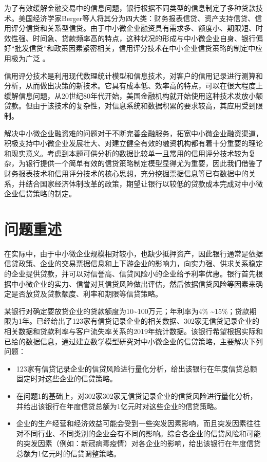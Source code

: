 \documentclass{cumcmthesis}
\begin{document}
为了有效缓解金融交易中的信息问题，银行根据不同类型的信息制定了多种贷款技术。美国经济学家Berger等人将其分为四大类：财务报表信贷、资产支持信贷、信用评分信贷和关系型信贷。由于中小微企业融资具有需求多、额度小、期限短、时效性强、时间急、贷款频率高的特点，这种状况的形成与中小微企业自身、银行偏好“批发信贷”和政策因素紧密相关，信用评分技术在中小企业信贷策略的制定中应用极为广泛 。

信用评分技术是利用现代数理统计模型和信息技术，对客户的信用记录进行测算和分析，从而做出决策的新技术。它具有成本低、效率高的特点，可以在很大程度上缓解信息问题，从20世纪80年代开始，美国金融机构就开始使用这种技术发放小额贷款。但由于该技术的复杂性，对信息系统和数据积累的要求较高，其应用受到限制。		

解决中小微企业融资难的问题对于不断完善金融服务，拓宽中小微企业融资渠道，积极支持中小微企业发展壮大、对建立健全有效的融资机构都有着十分重要的理论和现实意义。考虑到本题可供分析的数据比较单一且常用的信用评分技术较为复杂，为银行提供一个简单有效的信贷策略制定模型显得尤为重要，因此我们借鉴了财务报表技术和信用评分技术的核心思想，充分挖掘票据信息等已有数据中的关系，并结合国家经济体制改革的政策，期望让银行以较低的贷款成本完成对中小微企业信贷策略的制定。



\section{问题重述}

在实际中，由于中小微企业规模相对较小，也缺少抵押资产，因此银行通常是依据信贷政策、企业的交易票据信息和上下游企业的影响力，向实力强、供求关系稳定的企业提供贷款，并可以对信誉高、信贷风险小的企业给予利率优惠。银行首先根据中小微企业的实力、信誉对其信贷风险做出评估，然后依据信贷风险等因素来确定是否放贷及贷款额度、利率和期限等信贷策略。

某银行对确定要放贷企业的贷款额度为10\textasciitilde 100万元；年利率为4\% \textasciitilde 15\%；贷款期限为1年。已经给出了123家有信贷记录企业的相关数据、302家无信贷记录企业的相关数据和贷款利率与客户流失率关系的2019年统计数据。该银行希望根据实际和已给的数据信息，通过建立数学模型研究对中小微企业的信贷策略，主要解决下列问题：
\begin{itemize}
    \item 123家有信贷记录企业的信贷风险进行量化分析，给出该银行在年度信贷总额固定时对这些企业的信贷策略。
    \item 在问题1的基础上，对302家302家无信贷记录企业的信贷风险进行量化分析，并给出该银行在年度信贷总额为1亿元时对这些企业的信贷策略。
    \item 企业的生产经营和经济效益可能会受到一些突发因素影响，而且突发因素往往对不同行业、不同类别的企业会有不同的影响。综合各企业的信贷风险和可能的突发因素（例如：新冠病毒疫情）对各企业的影响，给出该银行在年度信贷总额为1亿元时的信贷调整策略。
\end{itemize}
\end{document}
